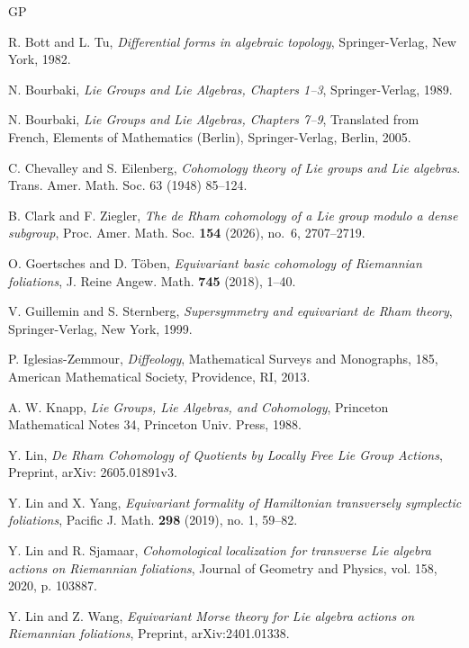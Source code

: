 \documentclass[reqno, 11pt]{amsart}
\theoremstyle{definition}
\theoremstyle{property}
\theoremstyle{remark}
\numberwithin{equation}{section}
\begin{document}
 \begin{thebibliography}{GP}

R. Bott and L. Tu,
\emph{Differential forms in algebraic topology},
Springer-Verlag, New York, 1982.

N. Bourbaki,
\emph{Lie Groups and Lie Algebras, Chapters 1--3},
Springer-Verlag, 1989.

N. Bourbaki,
\emph{Lie Groups and Lie Algebras, Chapters 7--9},
Translated from French, Elements of Mathematics (Berlin),
Springer-Verlag, Berlin, 2005.

  C. Chevalley and S. Eilenberg, \emph{Cohomology theory of Lie groups and Lie algebras}.
Trans. Amer. Math. Soc. 63 (1948) 85--124.

B. Clark and F. Ziegler,
\emph{The de Rham cohomology of a Lie group modulo a dense subgroup},
        Proc. Amer. Math. Soc. \textbf{154} (2026), no.~6, 2707--2719.

O. Goertsches and D. T\"oben,
\emph{Equivariant basic cohomology of Riemannian foliations},
J. Reine Angew. Math. \textbf{745} (2018), 1--40.

V. Guillemin and S. Sternberg,
\emph{Supersymmetry and equivariant de Rham theory},
Springer-Verlag, New York, 1999.

P. Iglesias-Zemmour,
\emph{Diffeology},
Mathematical Surveys and Monographs, 185,
American Mathematical Society, Providence, RI, 2013.

A. W. Knapp,
\emph{Lie Groups, Lie Algebras, and Cohomology},
Princeton Mathematical Notes 34, Princeton Univ. Press, 1988.



 Y. Lin, \emph{ De Rham Cohomology of Quotients by Locally Free Lie Group Actions}, Preprint, arXiv: 2605.01891v3.

Y. Lin and X. Yang,
\emph{Equivariant formality of Hamiltonian transversely symplectic foliations},
Pacific J. Math. \textbf{298} (2019), no. 1, 59--82.

Y. Lin and R. Sjamaar,
\emph{Cohomological localization for transverse Lie algebra actions on Riemannian foliations},
Journal of Geometry and Physics, vol. 158, 2020, p. 103887.

Y. Lin and Z. Wang,
\emph{Equivariant Morse theory for Lie algebra actions on Riemannian foliations},
Preprint, arXiv:2401.01338.




\end{thebibliography}
\end{document}
